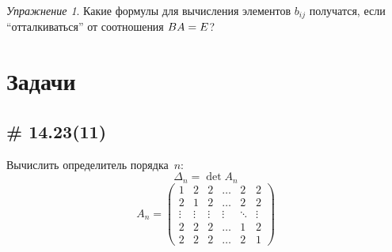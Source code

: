 \documentclass[a4paper,12pt]{article}
\theoremstyle{remark}
\newtheorem*{exercise}{Упражнение}
\begin{document}
  \begin{exercise}
    Какие формулы для вычисления элементов $b_{ij}$ получатся, если ``отталкиваться'' от соотношения $BA \hm= E$?
  \end{exercise}
  
  
  
  
  
  
  
  \section{Задачи}
  
  \subsection{\# 14.23(11)}
  
  Вычислить определитель порядка~$n$:
  \[
    \Delta_n = \det A_n
  \]
  \[
    A_n = \begin{pmatrix}
      1      & 2      & 2      & \ldots & 2      & 2\\
      2      & 1      & 2      & \ldots & 2      & 2\\
      \vdots & \vdots & \vdots & \vdots & \ddots & \vdots\\
      2      & 2      & 2      & \ldots & 1      & 2\\
      2      & 2      & 2      & \ldots & 2      & 1
    \end{pmatrix}
  \]
  
\end{document}
